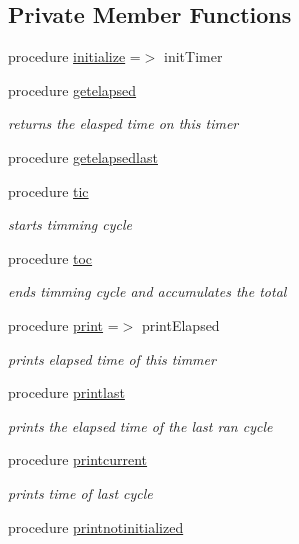 \subsection*{Private Member Functions}
\begin{DoxyCompactItemize}
\item 
procedure \mbox{\hyperlink{structsimulationtimer__mod_1_1timer__class_a5ff00a291d05b6135e421e4b5718c810}{initialize}} =$>$ init\+Timer
\item 
procedure \mbox{\hyperlink{structsimulationtimer__mod_1_1timer__class_a8d93e7223e1bbd78bc38c72e88fd2e41}{getelapsed}}
\begin{DoxyCompactList}\small\item\em returns the elasped time on this timer \end{DoxyCompactList}\item 
procedure \mbox{\hyperlink{structsimulationtimer__mod_1_1timer__class_afdc04887277d28174b69cfa00ede5f38}{getelapsedlast}}
\item 
procedure \mbox{\hyperlink{structsimulationtimer__mod_1_1timer__class_ab51b61f25cc929cb440d0b9ffd039b34}{tic}}
\begin{DoxyCompactList}\small\item\em starts timming cycle \end{DoxyCompactList}\item 
procedure \mbox{\hyperlink{structsimulationtimer__mod_1_1timer__class_aa86e28516c4a22dac2aba3ccbf027233}{toc}}
\begin{DoxyCompactList}\small\item\em ends timming cycle and accumulates the total \end{DoxyCompactList}\item 
procedure \mbox{\hyperlink{structsimulationtimer__mod_1_1timer__class_a34a700b5bb4f2a401a582caf995e4cae}{print}} =$>$ print\+Elapsed
\begin{DoxyCompactList}\small\item\em prints elapsed time of this timmer \end{DoxyCompactList}\item 
procedure \mbox{\hyperlink{structsimulationtimer__mod_1_1timer__class_a1ac8844fe0766c418d301064155d9cc9}{printlast}}
\begin{DoxyCompactList}\small\item\em prints the elapsed time of the last ran cycle \end{DoxyCompactList}\item 
procedure \mbox{\hyperlink{structsimulationtimer__mod_1_1timer__class_ae7896d93f60b31af526f91adc324a641}{printcurrent}}
\begin{DoxyCompactList}\small\item\em prints time of last cycle \end{DoxyCompactList}\item 
procedure \mbox{\hyperlink{structsimulationtimer__mod_1_1timer__class_a559692fe52fabf6a4f5078b03ed08620}{printnotinitialized}}
\end{DoxyCompactItemize}
